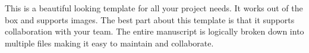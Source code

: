 This is a beautiful looking template for all your project needs. It works out of the box and supports images. The best part about this template is that it supports collaboration with your team. The entire manuscript is logically broken down into multiple files making it easy to maintain and collaborate.